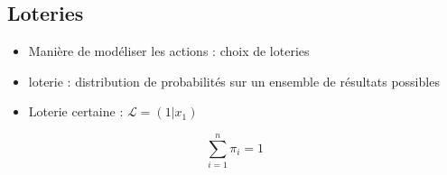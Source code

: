\subsection{Loteries}

\begin{itemize}
\item Manière de modéliser les actions : choix de loteries
\item loterie : distribution de probabilités sur un ensemble de résultats possibles
\item Loterie certaine : $\mathcal{L} = (1|x_1)$
\end{itemize}

\begin{equation*}
\displaystyle\sum_{i=1}^{n} \pi_i = 1
\end{equation*}
